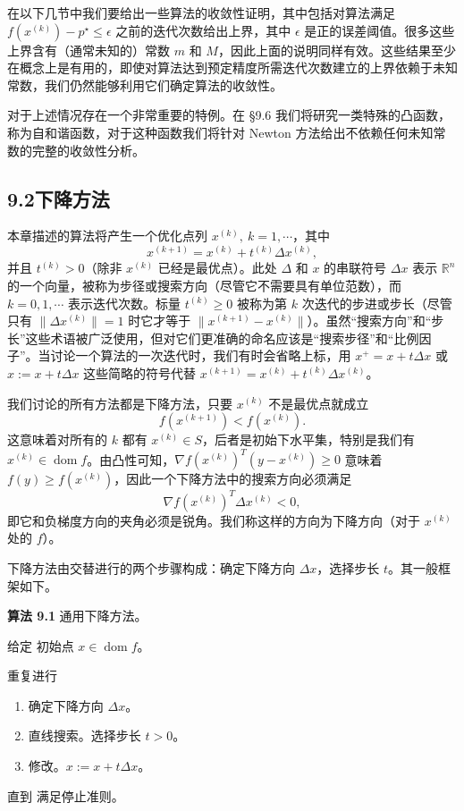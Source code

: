 \documentclass[UTF8, 12pt, fontset=fandol, oneside]{ctexart}
\begin{document}
在以下几节中我们要给出一些算法的收敛性证明，其中包括对算法满足 $f(x^{(k)})-p^\star\leq\epsilon$ 之前的迭代次数给出上界，其中 $\epsilon$ 是正的误差阈值。很多这些上界含有（通常未知的）常数 $m$ 和 $M$，因此上面的说明同样有效。这些结果至少在概念上是有用的，即使对算法达到预定精度所需迭代次数建立的上界依赖于未知常数，我们仍然能够利用它们确定算法的收敛性。

对于上述情况存在一个非常重要的特例。在 \S9.6 我们将研究一类特殊的凸函数，称为自和谐函数，对于这种函数我们将针对 Newton 方法给出不依赖任何未知常数的完整的收敛性分析。

\subsection*{9.2\quad 下降方法}

本章描述的算法将产生一个优化点列 $x^{(k)},\ k=1,\cdots$，其中
\[
x^{(k+1)}=x^{(k)}+t^{(k)}\Delta x^{(k)},
\]
并且 $t^{(k)}>0$（除非 $x^{(k)}$ 已经是最优点）。此处 $\Delta$ 和 $x$ 的串联符号 $\Delta x$ 表示 $\mathbb{R}^n$ 的一个向量，被称为步径或搜索方向（尽管它不需要具有单位范数），而 $k=0,1,\cdots$ 表示迭代次数。标量 $t^{(k)}\geq0$ 被称为第 $k$ 次迭代的步进或步长（尽管只有 $\|\Delta x^{(k)}\|=1$ 时它才等于 $\|x^{(k+1)}-x^{(k)}\|$）。虽然“搜索方向”和“步长”这些术语被广泛使用，但对它们更准确的命名应该是“搜索步径”和“比例因子”。当讨论一个算法的一次迭代时，我们有时会省略上标，用 $x^+=x+t\Delta x$ 或 $x:=x+t\Delta x$ 这些简略的符号代替 $x^{(k+1)}=x^{(k)}+t^{(k)}\Delta x^{(k)}$。

我们讨论的所有方法都是下降方法，只要 $x^{(k)}$ 不是最优点就成立
\[
f(x^{(k+1)})<f(x^{(k)}).
\]
这意味着对所有的 $k$ 都有 $x^{(k)}\in S$，后者是初始下水平集，特别是我们有 $x^{(k)}\in\operatorname{dom} f$。由凸性可知，$\nabla f(x^{(k)})^T(y-x^{(k)})\geq0$ 意味着 $f(y)\geq f(x^{(k)})$，因此一个下降方法中的搜索方向必须满足
\[
\nabla f(x^{(k)})^T\Delta x^{(k)}<0,
\]
即它和负梯度方向的夹角必须是锐角。我们称这样的方向为下降方向（对于 $x^{(k)}$ 处的 $f$）。

下降方法由交替进行的两个步骤构成：确定下降方向 $\Delta x$，选择步长 $t$。其一般框架如下。

\noindent\textbf{算法 9.1}\quad
通用下降方法。

给定 初始点 $x\in\operatorname{dom} f$。

重复进行
\begin{enumerate}
\item 确定下降方向 $\Delta x$。
\item 直线搜索。选择步长 $t>0$。
\item 修改。$x:=x+t\Delta x$。
\end{enumerate}
直到 满足停止准则。
\end{document}
